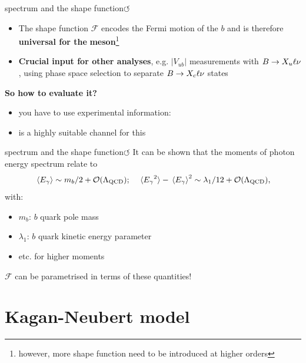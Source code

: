 \documentclass[xcolor=dvipsnames]{beamer}
\begin{document}
   \begin{frame}{\BtoXsgamma spectrum and the shape function\hyperlink{frame:A}{$\circlearrowleft$}}
      \scriptsize
      \begin{itemize}
         \item The shape function $\mathcal{F}$ encodes the Fermi motion of the $b$ and is therefore \textbf{universal for the}  \textbf{meson}\footnote[1]{\tiny however, more shape function need to be introduced at higher orders}
         \item \textbf{Crucial input for other analyses}, e.g. $|V_{ub}|$ measurements with $B\rightarrow X_u\ell\nu$, using phase space selection to separate $B\rightarrow X_c\ell\nu$ states
      \end{itemize}

      \textbf{So how to evaluate it?}
      \begin{itemize}
         \item[\ra] you have to use experimental information: 
         \item[\ra] \BtoXsgamma is a highly suitable channel for this
      \end{itemize}

   \end{frame}

   \begin{frame}{\BtoXsgamma spectrum and the shape function\hyperlink{frame:A}{$\circlearrowleft$}}
      \scriptsize
      It can be shown that the moments of photon energy spectrum relate to
      \begin{equation}\nonumber
         \expval**{{E_{\gamma}}} \sim m_b/2+{\cal O}(\Lambda_{\mathrm{QCD}}); \quad \expval**{{E_{\gamma}}^2}-\expval**{{E_{\gamma}}}^2 \sim \lambda_1/12+{\cal O}(\Lambda_{\mathrm{QCD}}),
     \end{equation}
     with:
     \begin{itemize}
      \item [] $m_b$: $b$ quark pole mass
      \item [] $\lambda_1$: $b$ quark kinetic energy parameter
      \item [] etc. for higher moments
     \end{itemize}
   $\mathcal{F}$ can be parametrised in terms of these quantities!
   \end{frame}

   \section{Kagan-Neubert model}
\end{document}
